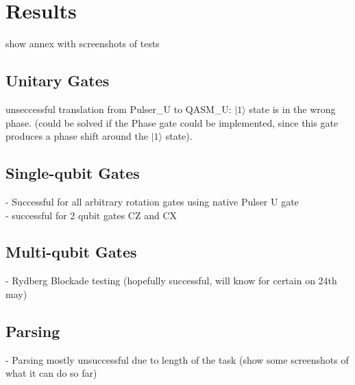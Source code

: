 \section{Results}
show annex with screenshots of tests\\
\subsection{Unitary Gates}
unseccessful translation from Pulser\_U to QASM\_U: $|1 \rangle$ state is in the wrong phase. (could be solved if the Phase gate could be implemented, since this gate produces a phase shift around the $|1 \rangle$ state).\\
\subsection{Single-qubit Gates}
- Successful for all arbitrary rotation gates using native Pulser U gate\\
- successful for 2 qubit gates CZ and CX\\
\subsection{Multi-qubit Gates}
- Rydberg Blockade testing (hopefully successful, will know for certain on 24th may)\\
\subsection{Parsing}
- Parsing mostly unsuccessful due to length of the task (show some screenshots of what it can do so far)\\